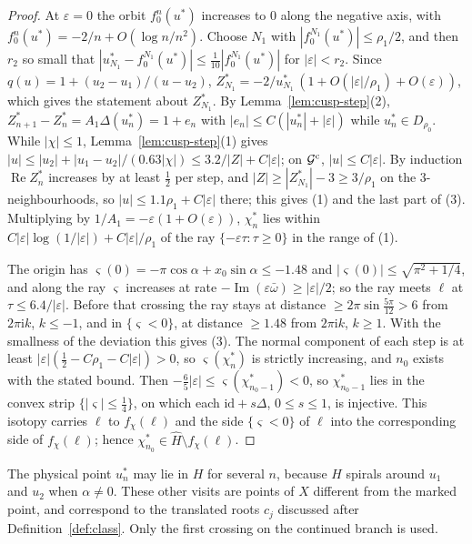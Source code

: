 \documentclass[11pt]{amsart}
\theoremstyle{definition}
\newcommand{\ii}{\mathrm{i}}
\begin{document}
\begin{proof}
At $\varepsilon=0$ the orbit $f_0^n(u^*)$ increases to $0$ along the negative axis,
with $f_0^n(u^*)=-2/n+O(\log n/n^2)$.  Choose $N_1$ with
$|f_0^{N_1}(u^*)|\le\rho_1/2$, and then $r_2$ so small that
$|u^*_{N_1}-f_0^{N_1}(u^*)|\le\tfrac1{10}|f_0^{N_1}(u^*)|$ for $|\varepsilon|<r_2$.
Since $q(u)=1+(u_2-u_1)/(u-u_2)$,
$Z^*_{N_1}=-2/u^*_{N_1}\,(1+O(|\varepsilon|/\rho_1)+O(\varepsilon))$, which gives the statement
about $Z^*_{N_1}$.  By Lemma~\ref{lem:cusp-step}(2),
$Z^*_{n+1}-Z^*_n=A_1\Delta(u^*_n)=1+e_n$ with $|e_n|\le C(|u^*_n|+|\varepsilon|)$ while
$u^*_n\in D_{\rho_0}$.  While $|\chi|\le1$, Lemma~\ref{lem:cusp-step}(1) gives
$|u|\le|u_2|+|u_1-u_2|/(0.63|\chi|)\le3.2/|Z|+C|\varepsilon|$; on $\mathcal G^{\rm c}$, $|u|\le C|\varepsilon|$.
By induction $\operatorname{Re}Z^*_n$ increases by at least $\tfrac12$ per step, and
$|Z|\ge|Z^*_{N_1}|-3\ge3/\rho_1$ on the $3$-neighbourhoods, so $|u|\le1.1\rho_1+C|\varepsilon|$
there; this gives (1) and the last part of (3).  Multiplying by
$1/A_1=-\varepsilon(1+O(\varepsilon))$, $\chi^*_n$ lies within $C|\varepsilon|\log(1/|\varepsilon|)+C|\varepsilon|/\rho_1$ of the
ray $\{-\varepsilon\tau:\tau\ge0\}$ in the range of (1).

The origin has $\varsigma(0)=-\pi\cos\alpha+x_0\sin\alpha\le-1.48$ and
$|\varsigma(0)|\le\sqrt{\pi^2+1/4}$, and along the ray $\varsigma$ increases at rate
$-\operatorname{Im}(\varepsilon\bar\omega)\ge|\varepsilon|/2$; so the ray meets $\ell$ at $\tau\le6.4/|\varepsilon|$.
Before that crossing the ray stays at distance $\ge2\pi\sin\tfrac{5\pi}{12}>6$ from
$2\pi\ii k$, $k\le-1$, and in $\{\varsigma<0\}$, at distance $\ge1.48$ from $2\pi\ii k$,
$k\ge1$.  With the smallness of the deviation this gives (3).  The normal
component of each step is at least $|\varepsilon|(\tfrac12-C\rho_1-C|\varepsilon|)>0$, so
$\varsigma(\chi^*_n)$ is strictly increasing, and $n_0$ exists with the stated bound.
Then $-\tfrac65|\varepsilon|\le\varsigma(\chi^*_{n_0-1})<0$, so $\chi^*_{n_0-1}$ lies in the convex strip
$\{|\varsigma|\le\tfrac14\}$, on which each $\mathrm{id}+s\Delta$, $0\le s\le1$, is injective.
This isotopy carries $\ell$ to $f_\chi(\ell)$ and the side $\{\varsigma<0\}$ of $\ell$ into
the corresponding side of $f_\chi(\ell)$; hence $\chi^*_{n_0}\in\hat H\setminus f_\chi(\ell)$.
\end{proof}

The physical point $u^*_{n}$ may lie in $H$ for several $n$, because $H$
spirals around $u_1$ and $u_2$ when $\alpha\ne0$.  These other visits are points of
$X$ different from the marked point, and correspond to the translated roots
$c_j$ discussed after Definition~\ref{def:class}.  Only the first crossing on
the continued branch is used.
\end{document}
